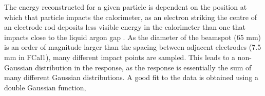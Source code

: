 
The energy reconstructed for a given particle is dependent on the position at which that particle impacts the calorimeter, as an electron striking the centre of an electrode rod deposits less visible energy in the calorimeter than one that impacts close to the liquid argon gap \cite{TB98_electron_signals}. As the diameter of the beamspot (65 mm) is an order of magnitude larger than the spacing between adjacent electrodes (7.5 mm in FCal1), many different impact points are sampled. This leads to a non-Gaussian distribution in the response, as the response is essentially the sum of many different Gaussian distributions. A good fit to the data is obtained using a double Gaussian function,

